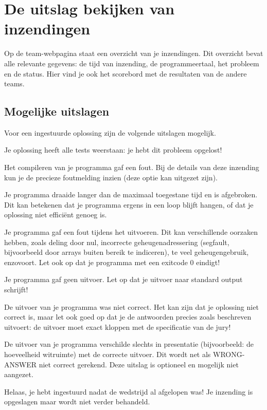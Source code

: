 \section{De uitslag bekijken van inzendingen}

Op de team-webpagina staat een overzicht van je inzendingen.
Dit overzicht bevat alle relevante gegevens: de tijd van inzending, de
programmeertaal, het probleem en de status. Hier vind je ook het scorebord
met de resultaten van de andere teams.

\subsection{Mogelijke uitslagen}

Voor een ingestuurde oplossing zijn de volgende uitslagen mogelijk.

\begin{description}[\setleftmargin{4.5cm}]
\item[CORRECT]
Je oplossing heeft alle tests weerstaan: je hebt dit probleem opgelost!

\item[COMPILER-ERROR]
Het compileren van je programma gaf een fout. Bij de details
van deze inzending kun je de precieze foutmelding inzien
(deze optie kan uitgezet zijn).

\item[TIMELIMIT]
Je programma draaide langer dan de maximaal toegestane tijd en is
afgebroken. Dit kan betekenen dat je programma ergens in een loop
blijft hangen, of dat je oplossing niet effici\"ent genoeg is.

\item[RUN-ERROR]
Je programma gaf een fout tijdens het uitvoeren. Dit kan verschillende
oorzaken hebben, zoals deling door nul, incorrecte geheugen\-adressering
(segfault, bijvoorbeeld door arrays buiten bereik te indiceren), te
veel geheugengebruik, enzovoort.
Let ook op dat je programma met een exitcode 0 eindigt!

\item[NO-OUTPUT]
Je programma gaf geen uitvoer. Let op dat je uitvoer naar standard
output schrijft!

\item[WRONG-ANSWER]
De uitvoer van je programma was niet correct. Het kan zijn dat je
oplossing niet correct is, maar let ook goed op dat je de antwoorden
precies zoals beschreven uitvoert: de uitvoer moet exact kloppen met
de specificatie van de jury!

\item[PRESENTATION-ERROR]
De uitvoer van je programma verschilde slechts in presentatie
(bijvoorbeeld: de hoeveelheid witruimte) met de correcte uitvoer.
Dit wordt net als WRONG-ANSWER niet correct gerekend. Deze uitslag
is optioneel en mogelijk niet aangezet.

\item[TOO-LATE]
Helaas, je hebt ingestuurd nadat de wedstrijd al afgelopen was!
Je inzending is opgeslagen maar wordt niet verder behandeld.
\end{description}

